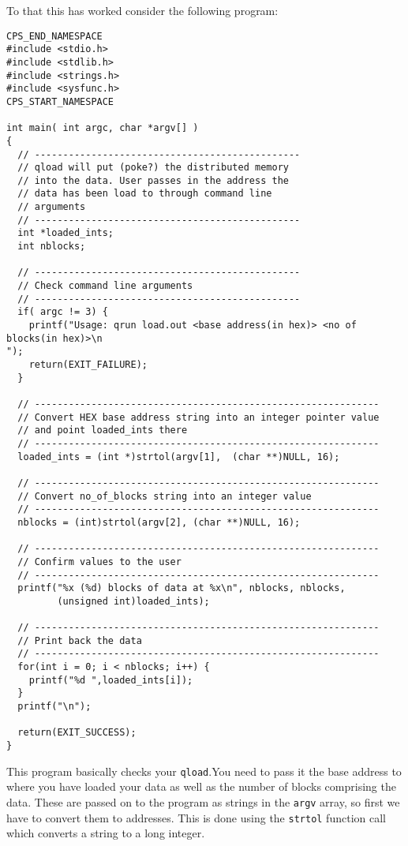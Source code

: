 To that this has worked consider the following program:
{\scriptsize
\begin{verbatim}
CPS_END_NAMESPACE
#include <stdio.h>
#include <stdlib.h>
#include <strings.h>
#include <sysfunc.h>
CPS_START_NAMESPACE

int main( int argc, char *argv[] )
{
  // -----------------------------------------------
  // qload will put (poke?) the distributed memory
  // into the data. User passes in the address the
  // data has been load to through command line
  // arguments
  // -----------------------------------------------
  int *loaded_ints;
  int nblocks;

  // -----------------------------------------------
  // Check command line arguments
  // -----------------------------------------------
  if( argc != 3) {
    printf("Usage: qrun load.out <base address(in hex)> <no of blocks(in hex)>\n
");
    return(EXIT_FAILURE);
  }

  // -------------------------------------------------------------
  // Convert HEX base address string into an integer pointer value
  // and point loaded_ints there
  // -------------------------------------------------------------
  loaded_ints = (int *)strtol(argv[1],  (char **)NULL, 16);

  // -------------------------------------------------------------
  // Convert no_of_blocks string into an integer value
  // -------------------------------------------------------------
  nblocks = (int)strtol(argv[2], (char **)NULL, 16);

  // -------------------------------------------------------------
  // Confirm values to the user
  // -------------------------------------------------------------
  printf("%x (%d) blocks of data at %x\n", nblocks, nblocks,
         (unsigned int)loaded_ints);

  // -------------------------------------------------------------
  // Print back the data
  // -------------------------------------------------------------
  for(int i = 0; i < nblocks; i++) {
    printf("%d ",loaded_ints[i]);
  }
  printf("\n");

  return(EXIT_SUCCESS);
}
\end{verbatim}
}

This program basically checks your {\tt qload}.You need to  pass it the base
address to where you have loaded your data as well as the number of blocks 
comprising the data. These are passed on to the program as strings
in the {\tt argv} array, so first we have to convert them to addresses.
This is done using the {\tt strtol} function call which converts a 
string to a long integer.

